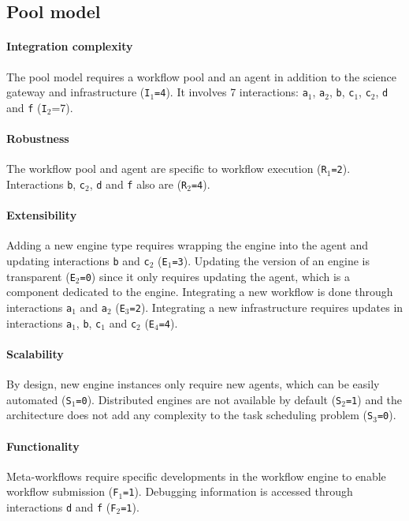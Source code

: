 \documentclass[preprint,3p,twocolumn]{elsarticle}
\newcommand{\correction}[1]{\color{blue}#1\color{black}\xspace}
\begin{document}
\subsection{Pool model}

\paragraph{Integration complexity} The pool model requires a workflow pool and an
agent in addition to the science gateway and infrastructure
(\texttt{I$_1$=4}). It involves 7 interactions: \texttt{a$_1$},
\texttt{a$_2$}, \texttt{b}, \texttt{c$_1$}, \texttt{c$_2$}, \texttt{d}
and \texttt{f} (\texttt{I$_2$}=7).

\paragraph{Robustness} The workflow pool and agent are specific to
workflow execution (\texttt{R$_1$=2}). Interactions \texttt{b},
\texttt{c$_2$}, \texttt{d} and \texttt{f} also are (\texttt{R$_2$=4}).

\paragraph{Extensibility} Adding a new engine type requires wrapping
the engine into the agent and updating interactions \texttt{b} and
\texttt{c$_2$} (\texttt{E$_1$=3}). Updating the version of an engine
is transparent (\texttt{E$_2$=0}) since it only requires updating the
agent, which is a component dedicated to the engine. Integrating a new workflow is
done through interactions \texttt{a$_1$} and \texttt{a$_2$}
(\texttt{E$_3$=2}). Integrating a new infrastructure requires updates
in interactions \texttt{a$_1$}, \texttt{b}, \texttt{c$_1$} and \texttt{c$_2$}
(\texttt{E$_4$=4}).

\paragraph{Scalability} By design, new engine instances only require
new agents, which can be easily automated (\texttt{S$_1$=0}). Distributed engines are not available
by default (\texttt{S$_2$=1}) and the architecture does not add any
complexity to the task scheduling problem (\texttt{S$_3$=0}).

\paragraph{\correction{Functionality}} Meta-workflows require specific
developments in the workflow engine to enable workflow submission
(\texttt{\correction{F}$_1$=1}). Debugging information is accessed through
interactions \texttt{d} and \texttt{f} (\texttt{\correction{F}$_2$=1}).
\end{document}
